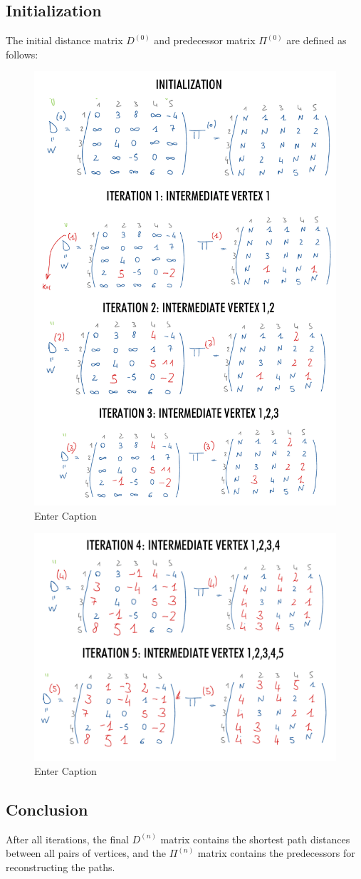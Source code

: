 \subsection{Initialization}
The initial distance matrix \( D^{(0)} \) and predecessor matrix \( \Pi^{(0)} \) are defined as follows:
\begin{figure}[h!]
    \centering
    \includegraphics[width=0.7\linewidth]{immagini//capitolo 14 esercizio/INITIALIZATION-1.png}
    \caption{Enter Caption}
    \label{fig:enter-label}
\end{figure}

\newpage
\begin{figure}[h!]
    \centering
    \includegraphics[width=0.75\linewidth]{immagini//capitolo 14 esercizio/INITIALIZATION-2.png}
    \caption{Enter Caption}
    \label{fig:enter-label}
\end{figure}

\subsection{Conclusion}
After all iterations, the final \( D^{(n)} \) matrix contains the shortest path distances between all pairs of vertices, and the \( \Pi^{(n)} \) matrix contains the predecessors for reconstructing the paths.
